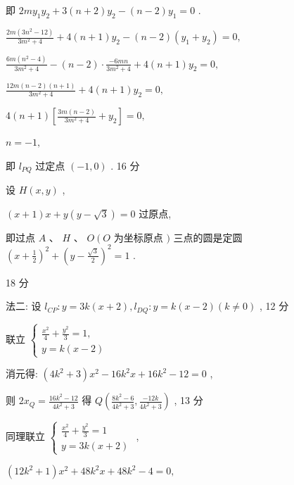 \documentclass[10pt]{article}
\begin{document}
即 \({2m}{y}_{1}{y}_{2} + 3\left( {n + 2}\right) {y}_{2} - \left( {n - 2}\right) {y}_{1} = 0\) .

\(\frac{{2m}\left( {3{n}^{2} - {12}}\right) }{3{m}^{2} + 4} + 4\left( {n + 1}\right) {y}_{2} - \left( {n - 2}\right) \left( {{y}_{1} + {y}_{2}}\right)  = 0,\)

\(\frac{{6m}\left( {{n}^{2} - 4}\right) }{3{m}^{2} + 4} - \left( {n - 2}\right)  \cdot  \frac{-{6mn}}{3{m}^{2} + 4} + 4\left( {n + 1}\right) {y}_{2} = 0,\)

\(\frac{{12m}\left( {n - 2}\right) \left( {n + 1}\right) }{3{m}^{2} + 4} + 4\left( {n + 1}\right) {y}_{2} = 0,\)

\(4\left( {n + 1}\right) \left\lbrack  {\frac{{3m}\left( {n - 2}\right) }{3{m}^{2} + 4} + {y}_{2}}\right\rbrack   = 0,\)

\(n =  - 1,\)

即 \({l}_{PQ}\) 过定点 \(\left( {-1,0}\right)\) . 16 分

设 \(H\left( {x,y}\right)\) ,

\(\left( {x + 1}\right) x + y\left( {y - \sqrt{3}}\right)  = 0\) 过原点,

即过点 \(A\text{ 、 }H\text{ 、 }O\left( O\right.\) 为坐标原点 \()\) 三点的圆是定圆 \({\left( x + \frac{1}{2}\right) }^{2} + {\left( y - \frac{\sqrt{3}}{2}\right) }^{2} = 1\) .

18 分

法二: 设 \({l}_{CP} : y = {3k}\left( {x + 2}\right) ,{l}_{DQ} : y = k\left( {x - 2}\right) \left( {k \neq  0}\right)\) , 12 分

联立 \(\left\{  \begin{array}{l} \frac{{x}^{2}}{4} + \frac{{y}^{2}}{3} = 1, \\  y = k\left( {x - 2}\right)  \end{array}\right.\)

消元得: \(\left( {4{k}^{2} + 3}\right) {x}^{2} - {16}{k}^{2}x + {16}{k}^{2} - {12} = 0\) ,

则 \(2{x}_{Q} = \frac{{16}{k}^{2} - {12}}{4{k}^{2} + 3}\) 得 \(Q\left( {\frac{8{k}^{2} - 6}{4{k}^{2} + 3},\frac{-{12k}}{4{k}^{2} + 3}}\right)\) , 13 分

同理联立 \(\left\{  \begin{array}{l} \frac{{x}^{2}}{4} + \frac{{y}^{2}}{3} = 1 \\  y = {3k}\left( {x + 2}\right)  \end{array}\right.\) ,

\(\left( {{12}{k}^{2} + 1}\right) {x}^{2} + {48}{k}^{2}x + {48}{k}^{2} - 4 = 0,\)
\end{document}
